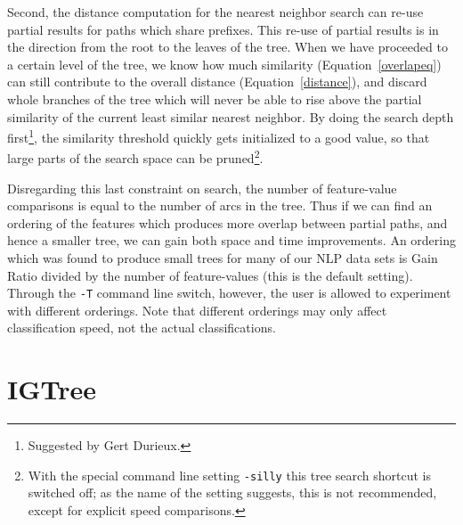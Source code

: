 \documentclass{report}
\begin{document}
Second, the distance computation for the nearest neighbor search can
re-use partial results for paths which share prefixes.  This re-use of
partial results is in the direction from the root to the leaves of the
tree. When we have proceeded to a certain level of the tree, we know
how much similarity (Equation~\ref{overlapeq}) can still contribute to
the overall distance (Equation~\ref{distance}), and discard whole
branches of the tree which will never be able to rise above the
partial similarity of the current least similar nearest neighbor. By
doing the search depth first\footnote{Suggested by Gert Durieux.}, the
similarity threshold quickly gets initialized to a good value, so that
large parts of the search space can be pruned\footnote{With the
  special command line setting {\tt -silly} this tree search shortcut
  is switched off; as the name of the setting suggests, this is not
  recommended, except for explicit speed comparisons.}.

Disregarding this last constraint on search, the number of
feature-value comparisons is equal to the number of arcs in the
tree. Thus if we can find an ordering of the features which produces
more overlap between partial paths, and hence a smaller tree, we can
gain both space and time improvements. An ordering which was found to
produce small trees for many of our NLP data sets is Gain Ratio
divided by the number of feature-values (this is the default
setting). Through the {\tt -T} command line switch, however, the user
is allowed to experiment with different orderings. Note that different
orderings may only affect classification speed, not the actual
classifications.

\section{IGTree}
\label{igtree}
\end{document}

